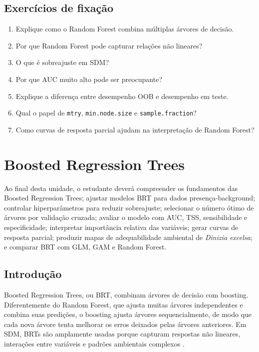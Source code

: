 \documentclass{ueap-sdm}
\begin{document}
\section{Exercícios de fixação}

\begin{enumerate}
	\item Explique como o Random Forest combina múltiplas árvores de decisão.
	\item Por que Random Forest pode capturar relações não lineares?
	\item O que é sobreajuste em SDM?
	\item Por que AUC muito alto pode ser preocupante?
	\item Explique a diferença entre desempenho OOB e desempenho em teste.
	\item Qual o papel de \texttt{mtry}, \texttt{min.node.size} e \texttt{sample.fraction}?
	\item Como curvas de resposta parcial ajudam na interpretação de Random Forest?
\end{enumerate}


\chapter[BRT]{Boosted Regression Trees}

\begin{objetivos}
	Ao final desta unidade, o estudante deverá compreender os fundamentos das Boosted Regression Trees; ajustar modelos BRT para dados presença-background; controlar hiperparâmetros para reduzir sobreajuste; selecionar o número ótimo de árvores por validação cruzada; avaliar o modelo com AUC, TSS, sensibilidade e especificidade; interpretar importância relativa das variáveis; gerar curvas de resposta parcial; produzir mapas de adequabilidade ambiental de \textit{Dinizia excelsa}; e comparar BRT com GLM, GAM e Random Forest.
\end{objetivos}

\section{Introdução}

Boosted Regression Trees, ou BRT, combinam árvores de decisão com boosting. Diferentemente do Random Forest, que ajusta muitas árvores independentes e combina suas predições, o boosting ajusta árvores sequencialmente, de modo que cada nova árvore tenta melhorar os erros deixados pelas árvores anteriores. Em SDM, BRTs são amplamente usadas porque capturam respostas não lineares, interações entre variáveis e padrões ambientais complexos \parencite{elith2008working,elith2009,guisan2017habitat}.
\end{document}
